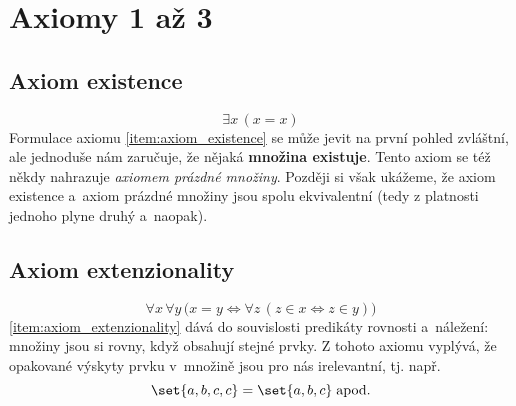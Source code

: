 \section{Axiomy 1 až 3}\label{sec:axiomy_1_az_3}
\subsection{Axiom existence}
\begin{equation*}
    \exists x\,(x=x)
\end{equation*}
Formulace axiomu \ref{item:axiom_existence} se může jevit na první pohled zvláštní, ale jednoduše nám zaručuje, že nějaká \textbf{množina existuje}. Tento axiom se též někdy nahrazuje \emph{axiomem prázdné množiny}. Později si však ukážeme, že axiom existence a~axiom prázdné množiny jsou spolu ekvivalentní (tedy z platnosti jednoho plyne druhý a~naopak).

\subsection{Axiom extenzionality}
\begin{equation*}
    \forall x\,\forall y\,\bigl(x=y \iff \forall z\,(z\in x \iff z\in y)\bigr)
\end{equation*}
\ref{item:axiom_extenzionality} dává do souvislosti predikáty rovnosti a~náležení: množiny jsou si rovny, když obsahují stejné prvky. Z tohoto axiomu vyplývá, že opakované výskyty prvku v~množině jsou pro nás irelevantní, tj. např.
\begin{equation*}
    \set{a,b,c,c}=\set{a,b,c}\;\text{apod.}
\end{equation*}

